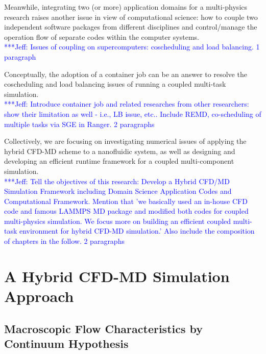 \documentclass[conference,final]{IEEEtran}
\newcommand{\skonote}[1]{ {\textcolor{blue} { ***Jeff: #1 }}}
\newcommand{\skonote}[1]{}
\begin{document}
Meanwhile, integrating two (or more) application domains for a multi-physics research raises another issue in view of computational science: how to couple two independent software packages from different disciplines and control/manage the operation flow of separate codes within the computer systems.\\
\skonote{Issues of coupling on supercomputers: coscheduling and load balancing. 1 paragraph}
\newline
\newline


Conceptually, the adoption of a container job can be an answer to resolve the coscheduling and load balancing issues of running a coupled multi-task simulation.\\
\skonote{Introduce container job and related researches from other researchers: show their limitation as well - i.e., LB issue, etc.. Include REMD, co-scheduling of multiple tasks via SGE in Ranger. 2 paragraphs}
\newline
\newline


Collectively, we are focusing on investigating numerical issues of applying the hybrid CFD-MD scheme to a nanofluidic system, as well as designing and developing an efficient runtime framework for a coupled multi-component simulation.\\
\skonote{Tell the objectives of this research: Develop a Hybrid CFD/MD Simulation Framework including Domain Science Application Codes and Computational Framework. Mention that 'we basically used an in-house CFD code and famous LAMMPS MD package and modified both codes for coupled multi-physics simulation. We focus more on building an efficient coupled multi-task environment for hybrid CFD-MD simulation.' Also include the composition of chapters in the follow. 2 paragraphs}
\newline
\newline


\section{A Hybrid CFD-MD Simulation Approach}


\subsection{Macroscopic Flow Characteristics by Continuum Hypothesis}
\end{document}
